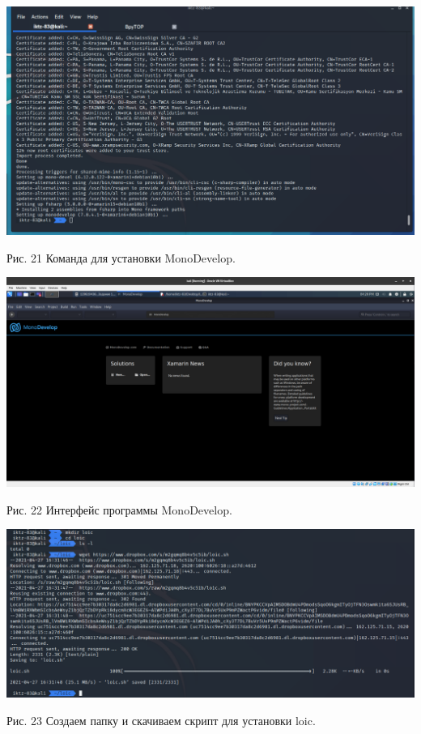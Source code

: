\documentclass[a4paper,14pt]{extarticle}
\begin{document}
\begin{center}
        \includegraphics[scale=0.4]{pics/21.png}

        Рис. 21 Команда для установки MonoDevelop.
        \vspace{1ex}

        \includegraphics[scale=0.26]{pics/22.png}

        Рис. 22 Интерфейс программы MonoDevelop.
        \vspace{1ex}

        \includegraphics[scale=0.42]{pics/23.png}

        Рис. 23 Создаем папку и скачиваем скрипт для установки loic.
        \vspace{1ex}


\end{center}
\end{document}

